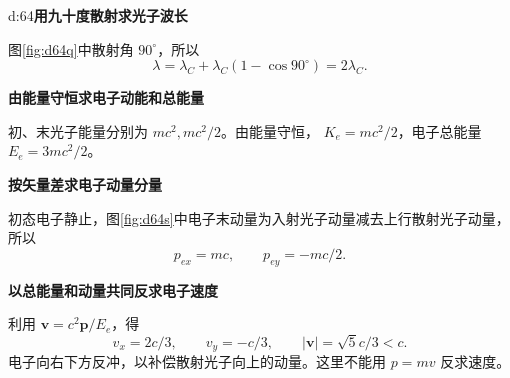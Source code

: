 \begin{drillsolution}{d:64}\textbf{用九十度散射求光子波长}\par\nobreak
图\ref{fig:d64q}中散射角 \(90^\circ\)，所以
\[
 \boxed{\lambda=\lambda_C+\lambda_C(1-\cos90^\circ)=2\lambda_C}.
\]


\par\medskip{}\noindent\textbf{由能量守恒求电子动能和总能量}\par\nobreak
初、末光子能量分别为 \(mc^2,mc^2/2\)。由能量守恒，
\(\boxed{K_e=mc^2/2}\)，电子总能量 \(E_e=3mc^2/2\)。


\par\medskip{}\noindent\textbf{按矢量差求电子动量分量}\par\nobreak
初态电子静止，图\ref{fig:d64s}中电子末动量为入射光子动量减去上行散射光子动量，所以
\[
 p_{ex}=mc,\qquad p_{ey}=-mc/2.
\]


\par\medskip{}\noindent\textbf{以总能量和动量共同反求电子速度}\par\nobreak
利用 \(\boldsymbol v=c^2\boldsymbol p/E_e\)，得
\[
 \boxed{v_x=2c/3,\qquad v_y=-c/3},\qquad
 |\boldsymbol v|=\sqrt5c/3<c.
\]
电子向右下方反冲，以补偿散射光子向上的动量。这里不能用 \(p=mv\) 反求速度。
\end{drillsolution}

